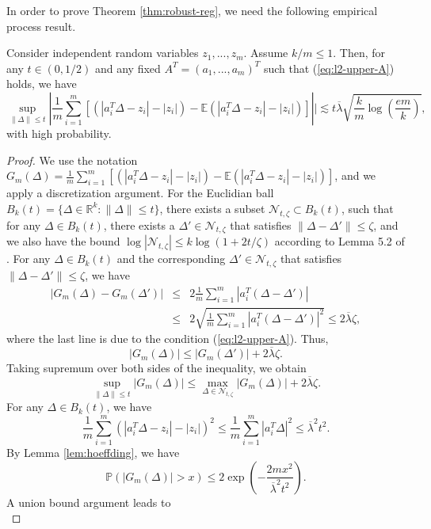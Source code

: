 In order to prove Theorem \ref{thm:robust-reg}, we need the following empirical process result.
\begin{lemma}\label{lem:EP}
Consider independent random variables $z_1,...,z_m$. Assume $k/m\leq 1$. Then, for any $t\in (0,1/2)$ and any fixed $A^T=(a_1,...,a_m)^T$ such that (\ref{eq:l2-upper-A}) holds, we have
$$\sup_{\|\Delta\|\leq t}\left|\frac{1}{m}\sum_{i=1}^m[(|a_i^T\Delta-z_i|-|z_i|)-\mathbb{E}(|a_i^T\Delta-z_i|-|z_i|)]\right|| \lesssim t\overline{\lambda}\sqrt{\frac{k}{m}\log\left(\frac{em}{k}\right)},$$
with high probability.
\end{lemma}
\begin{proof}
We use the notation $G_m(\Delta)=\frac{1}{m}\sum_{i=1}^m[(|a_i^T\Delta-z_i|-|z_i|)-\mathbb{E}(|a_i^T\Delta-z_i|-|z_i|)]$, and we apply a discretization argument. For the Euclidian ball $B_k(t)=\{\Delta\in\mathbb{R}^k:\|\Delta\|\leq t\}$, there exists a subset $\mathcal{N}_{t,\zeta}\subset B_k(t)$, such that for any $\Delta\in B_k(t)$, there exists a $\Delta'\in\mathcal{N}_{t,\zeta}$ that satisfies $\|\Delta-\Delta'\|\leq \zeta$, and we also have the bound $\log|\mathcal{N}_{t,\zeta}|\leq k\log(1+2t/\zeta)$ according to Lemma 5.2 of \cite{vershynin2010introduction}. For any $\Delta\in B_k(t)$ and the corresponding $\Delta'\in\mathcal{N}_{t,\zeta}$ that satisfies $\|\Delta-\Delta'\|\leq \zeta$, we have
\begin{eqnarray*}
|G_m(\Delta)-G_m(\Delta')| &\leq& 2\frac{1}{m}\sum_{i=1}^m|a_i^T(\Delta-\Delta')| \\
&\leq& 2\sqrt{\frac{1}{m}\sum_{i=1}^m|a_i^T(\Delta-\Delta')|^2} \leq 2\overline{\lambda}\zeta,
\end{eqnarray*}
where the last line is due to the condition (\ref{eq:l2-upper-A}). Thus,
$$\left|G_m(\Delta)\right| \leq \left|G_m(\Delta')\right| + 2\overline{\lambda}\zeta.$$
Taking supremum over both sides of the inequality, we obtain
\begin{equation}
\sup_{\|\Delta\|\leq t}|G_m(\Delta)| \leq \max_{\Delta\in\mathcal{N}_{t,\zeta}}\left|G_m(\Delta)\right| + 2\overline{\lambda}\zeta. \label{eq:disc-not-good}
\end{equation}
For any $\Delta\in B_k(t)$, we have
$$\frac{1}{m}\sum_{i=1}^m\left(|a_i^T\Delta-z_i|-|z_i|\right)^2\leq \frac{1}{m}\sum_{i=1}^m|a_i^T\Delta|^2\leq \overline{\lambda}^2t^2.$$
By Lemma \ref{lem:hoeffding}, we have
$$\mathbb{P}\left(\left|G_m(\Delta)\right| > x\right) \leq 2\exp\left(-\frac{2mx^2}{\overline{\lambda}^2t^2}\right).$$
A union bound argument leads to
\begin{equation}

\end{equation}
\end{proof}
